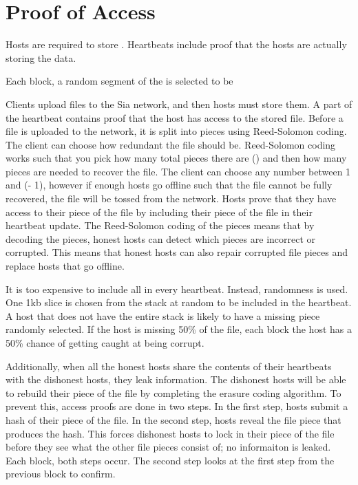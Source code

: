 \documentclass[twocolumn]{article}
\begin{document}
\section{Proof of Access}

Hosts are required to store \storageperhost. 
Heartbeats include proof that the hosts are actually storing the data.

Each block, a random \filechecksize \space segment of the \storageperhost \space is selected to be 

Clients upload files to the Sia network, and then hosts must store them.
A part of the heartbeat contains proof that the host has access to the stored file.
Before a file is uploaded to the network, it is split into \numhosts \space pieces using Reed-Solomon coding.
The client can choose how redundant the file should be.
Reed-Solomon coding works such that you pick how many total pieces there are (\numhosts) and then how many pieces are needed to recover the file.
The client can choose any number between 1 and (\numhosts \space - 1), however if enough hosts go offline such that the file cannot be fully recovered, the file will be tossed from the network.
Hosts prove that they have access to their piece of the file by including their piece of the file in their heartbeat update.
The Reed-Solomon coding of the pieces means that by decoding the pieces, honest hosts can detect which pieces are incorrect or corrupted.
This means that honest hosts can also repair corrupted file pieces and replace hosts that go offline.

It is too expensive to include all \storageperhost \space in every heartbeat.
Instead, randomness is used.
One 1kb slice is chosen from the \storageperhost \space stack at random to be included in the heartbeat.
A host that does not have the entire \storageperhost \space stack is likely to have a missing piece randomly selected.
If the host is missing 50\% of the file, each block the host has a 50\% chance of getting caught at being corrupt.

Additionally, when all the honest hosts share the contents of their heartbeats with the dishonest hosts, they leak information.
The dishonest hosts will be able to rebuild their piece of the file by completing the erasure coding algorithm.
To prevent this, access proofs are done in two steps.
In the first step, hosts submit a hash of their piece of the file.
In the second step, hosts reveal the file piece that produces the hash.
This forces dishonest hosts to lock in their piece of the file before they see what the other file pieces consist of; no informaiton is leaked.
Each block, both steps occur.
The second step looks at the first step from the previous block to confirm.
\end{document}

